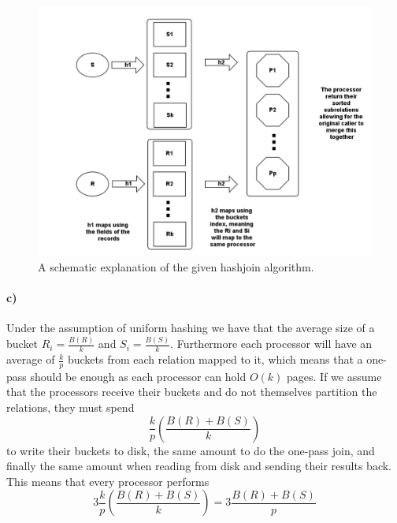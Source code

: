 \documentclass[a4paper, 11pt]{article}
\begin{document}
\begin{figure}[H]
  \centering
  \includegraphics[width=1\textwidth]{hashjoin.png}
  \caption{A schematic explanation of the given hashjoin algorithm.}
  \label{fig:hashjoin}
\end{figure}


\paragraph{c)} %

Under the assumption of uniform hashing we have that the average size of a bucket $R_i = \frac{B(R)}{k}$ and $S_i = \frac{B(S)}{k}$. Furthermore each processor will have an average of $\frac{k}{p}$ buckets from each relation mapped to it, which means that a one-pass should be enough as each processor can hold $O(k)$ pages. If we assume that the processors receive their buckets and do not themselves partition the relations, they must spend
\[
 \frac{k}{p} (\frac{B(R) + B(S)}{k})   
\]
to write their buckets to disk, the same amount to do the one-pass join, and finally the same amount when reading from disk and sending their results back. This means that every processor performs
\[
    3 \frac{k}{p} \left(\frac{B(R) + B(S)}{k}\right) = 3 \frac{B(R) + B(S)}{p}
\]


\end{document}
